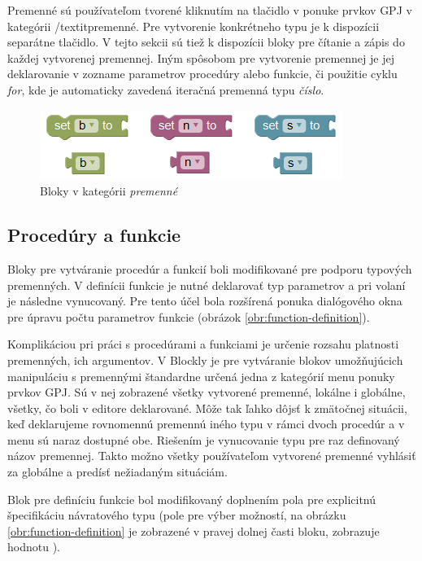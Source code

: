 Premenné sú používateľom tvorené kliknutím na tlačidlo v ponuke prvkov GPJ v kategórii /textit{premenné}. Pre vytvorenie konkrétneho typu je k dispozícii separátne tlačidlo. V tejto sekcii sú tiež k dispozícii bloky pre čítanie a zápis do každej vytvorenej premennej. Iným spôsobom pre vytvorenie premennej je jej deklarovanie v zozname parametrov procedúry alebo funkcie, či použitie cyklu \textit{for}, kde je automaticky zavedená iteračná premenná typu \textit{číslo}.

\vspace{3cm}

\begin{figure}[bh!]
\centerline{\includegraphics[]{images/variables-blocks}}
\caption[Bloky v kategórii \textit{premenné}]{Bloky v kategórii \textit{premenné}}
\label{obr:variables-blocks}
\end{figure}

\newpage

\subsection{Procedúry a funkcie}
Bloky pre vytváranie procedúr a funkcií boli modifikované pre podporu typových premenných. V definícii funkcie je nutné deklarovať typ parametrov a pri volaní je následne vynucovaný. Pre tento účel bola rozšírená ponuka dialógového okna pre úpravu počtu parametrov funkcie (obrázok \ref{obr:function-definition}).

Komplikáciou pri práci s procedúrami a funkciami je určenie rozsahu platnosti premenných, ich argumentov. V Blockly je pre vytváranie blokov umožňujúcich manipuláciu s premennými štandardne určená jedna z kategórií menu ponuky prvkov GPJ. Sú v nej zobrazené všetky vytvorené premenné, lokálne i globálne, všetky, čo boli v editore deklarované. Môže tak ľahko dôjsť k zmätočnej situácii, keď deklarujeme rovnomennú premennú iného typu v rámci dvoch procedúr a v menu sú naraz dostupné obe. Riešením je vynucovanie typu pre raz definovaný názov premennej. Takto možno všetky používateľom vytvorené premenné vyhlásiť za globálne a predísť nežiadaným situáciám.

Blok pre definíciu funkcie bol modifikovaný doplnením pola pre explicitnú špecifikáciu návratového typu (pole pre výber možností, na obrázku \ref{obr:function-definition} je zobrazené v pravej dolnej časti bloku, zobrazuje hodnotu ).

